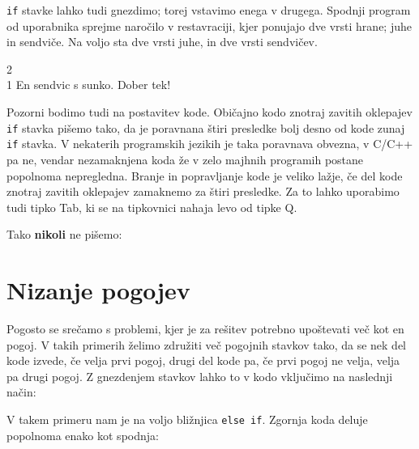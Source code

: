 \documentclass{book}
\begin{document}
\begin{examples}
\verb+if+ stavke lahko tudi gnezdimo; torej vstavimo enega v drugega.
Spodnji program od uporabnika sprejme naročilo v restavraciji, kjer ponujajo
dve vrsti hrane; juhe in sendviče. Na voljo sta dve vrsti juhe, in dve vrsti
sendvičev.


\begin{inout}
2\\
1
\tcblower
En sendvic s sunko. Dober tek!
\end{inout}
\end{examples}


\begin{errors}

Pozorni bodimo tudi na postavitev kode. Običajno kodo znotraj zavitih oklepajev
\verb+if+ stavka pišemo tako, da je poravnana štiri presledke bolj desno od
kode zunaj \verb+if+ stavka. V nekaterih programskih jezikih je taka poravnava
obvezna, v C/C++ pa ne, vendar nezamaknjena koda že v zelo majhnih programih
postane popolnoma nepregledna. Branje in popravljanje kode je veliko lažje, če
del kode znotraj zavitih oklepajev zamaknemo za štiri presledke. Za to lahko
uporabimo tudi tipko Tab, ki se na tipkovnici nahaja levo od tipke Q.

\vspace{0.3cm}
Tako \textbf{nikoli} ne pišemo:


\end{errors}

\section{Nizanje pogojev}

Pogosto se srečamo s problemi, kjer je za rešitev potrebno upoštevati več kot
en pogoj. V takih primerih želimo združiti več pogojnih stavkov tako, da se
nek del kode izvede, če velja prvi pogoj, drugi del kode pa, če prvi pogoj
ne velja, velja pa drugi pogoj. Z gnezdenjem stavkov lahko to v kodo vključimo
na naslednji način:


V takem primeru nam je na voljo bližnjica \verb+else if+. Zgornja koda deluje
popolnoma enako kot spodnja:
\end{document}
